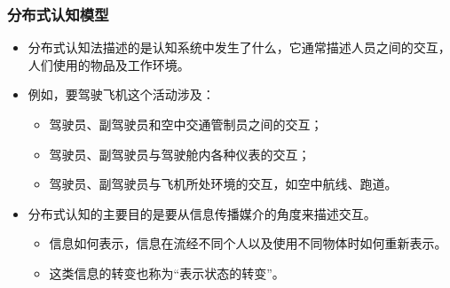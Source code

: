 \documentclass{beamer}
\begin{document}
\begin{frame}
	\frametitle{分布式认知模型}
	\beamertemplatetransparentcovereddynamicmedium
	\begin{itemize}
		\item 分布式认知法描述的是认知系统中发生了什么，它通常描述人员之间的交互，人们使用的物品及工作环境。\pause
		\item 例如，要驾驶飞机这个活动涉及：
		\begin{itemize}
			\item 驾驶员、副驾驶员和空中交通管制员之间的交互；
			\item 驾驶员、副驾驶员与驾驶舱内各种仪表的交互；
			\item 驾驶员、副驾驶员与飞机所处环境的交互，如空中航线、跑道。
		\end{itemize}\pause
		\item 分布式认知的主要目的是要从信息传播媒介的角度来描述交互。
		\begin{itemize}
			\item 信息如何表示，信息在流经不同个人以及使用不同物体时如何重新表示。
			\item 这类信息的转变也称为“表示状态的转变”。
		\end{itemize}
	\end{itemize}
\end{frame}
\end{document}
